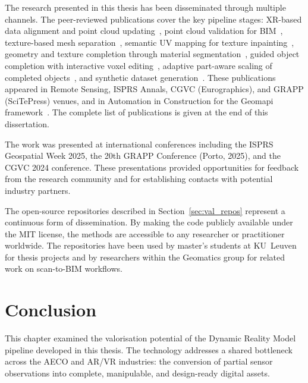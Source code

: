The research presented in this thesis has been disseminated through multiple channels. The peer-reviewed publications cover the key pipeline stages: XR-based data alignment and point cloud updating~\cite{vermandere_two-step_2022}, point cloud validation for BIM~\cite{geyter_point_2022}, texture-based mesh separation~\cite{vermandere_texture-based_2023}, semantic UV mapping for texture inpainting~\cite{vermandere_semantic_2024}, geometry and texture completion through material segmentation~\cite{vermandere_geometry_2025}, guided object completion with interactive voxel editing~\cite{vermandere_guided_2025}, adaptive part-aware scaling of completed objects~\cite{vermandere_adaptive_2026}, and synthetic dataset generation~\cite{vermandere_synthetic_2026}. These publications appeared in Remote Sensing, ISPRS Annals, CGVC (Eurographics), and GRAPP (SciTePress) venues, and in Automation in Construction for the Geomapi framework~\cite{bassier_geomapi_2024}. The complete list of publications is given at the end of this dissertation.

The work was presented at international conferences including the ISPRS Geospatial Week 2025, the 20th GRAPP Conference (Porto, 2025), and the CGVC 2024 conference. These presentations provided opportunities for feedback from the research community and for establishing contacts with potential industry partners.

The open-source repositories described in Section~\ref{sec:val_repos} represent a continuous form of dissemination. By making the code publicly available under the MIT license, the methods are accessible to any researcher or practitioner worldwide. The repositories have been used by master's students at KU~Leuven for thesis projects and by researchers within the Geomatics group for related work on scan-to-BIM workflows.

\section{Conclusion}
\label{sec:val_conclusion}

This chapter examined the valorisation potential of the Dynamic Reality Model pipeline developed in this thesis. The technology addresses a shared bottleneck across the AECO and AR/VR industries: the conversion of partial sensor observations into complete, manipulable, and design-ready digital assets.

